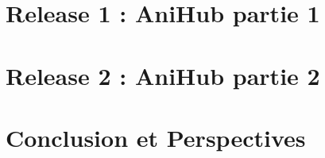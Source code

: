 \documentclass[a4paper, oneside, 12pt, final]{extreport}
\begin{document}
\chapter{Release 1 : AniHub partie 1 } 
\label{chap:3}
 


\chapter{Release 2 : AniHub partie 2 } 
\label{chap:4} 
 

\chapter*{Conclusion et Perspectives}
\label{chap:conclusion}


\newpage





\nocite{*}






 
%



\cleardoublepage%


\printglossaries
\printindex


\end{document}
